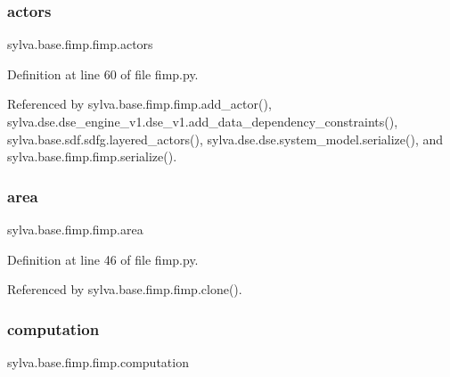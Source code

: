 \mbox{\label{classsylva_1_1base_1_1fimp_1_1fimp_af3b0060134dd494b1e24e91f6c7530e2}} 
\subsubsection{\texorpdfstring{actors}{actors}}
{\footnotesize\ttfamily sylva.\+base.\+fimp.\+fimp.\+actors}



Definition at line 60 of file fimp.\+py.



Referenced by sylva.\+base.\+fimp.\+fimp.\+add\+\_\+actor(), sylva.\+dse.\+dse\+\_\+engine\+\_\+v1.\+dse\+\_\+v1.\+add\+\_\+data\+\_\+dependency\+\_\+constraints(), sylva.\+base.\+sdf.\+sdfg.\+layered\+\_\+actors(), sylva.\+dse.\+dse.\+system\+\_\+model.\+serialize(), and sylva.\+base.\+fimp.\+fimp.\+serialize().

\mbox{\label{classsylva_1_1base_1_1fimp_1_1fimp_aba97f75ec38d4e542e7a7f5ed08056f4}} 
\subsubsection{\texorpdfstring{area}{area}}
{\footnotesize\ttfamily sylva.\+base.\+fimp.\+fimp.\+area}



Definition at line 46 of file fimp.\+py.



Referenced by sylva.\+base.\+fimp.\+fimp.\+clone().

\mbox{\label{classsylva_1_1base_1_1fimp_1_1fimp_aa96a232d193bcdf9f2048d4d346f906e}} 
\subsubsection{\texorpdfstring{computation}{computation}}
{\footnotesize\ttfamily sylva.\+base.\+fimp.\+fimp.\+computation}



